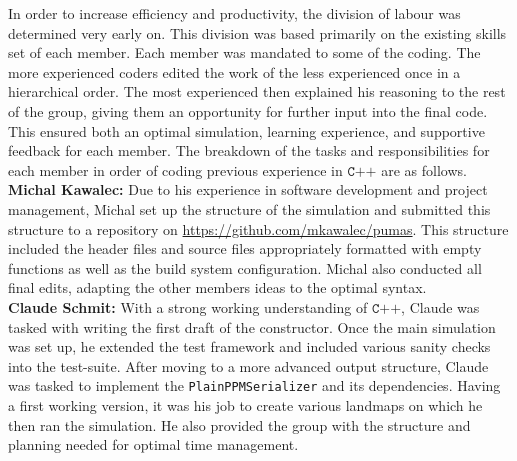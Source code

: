 \documentclass[a4paper,11pt]{article}
\begin{document}
In order to increase efficiency and productivity, the division of labour was determined very early on.  This division was based primarily on the existing skills set of each member.  Each member was mandated to some of the coding. The more experienced coders edited the work of the less experienced once in a hierarchical order. The most experienced then explained his reasoning to the rest of the group, giving them an opportunity for further input into the final code.  This ensured both an optimal simulation, learning experience, and supportive feedback for each member.  The breakdown of the tasks and responsibilities for each member in order of coding previous experience in $\texttt{C++}$ are as follows.
\\

\noindent\textbf{Michal Kawalec:}  Due to his experience in software development and project management, Michal set up the structure of the simulation and submitted this structure to a repository on \url{https://github.com/mkawalec/pumas}.  This structure included the header files and source files appropriately formatted with empty functions as well as the build system configuration. Michal also conducted all final edits, adapting the other members ideas to the optimal syntax.
\\

\noindent\textbf{Claude  Schmit:}   With a strong working understanding of $\texttt{C++}$, Claude was tasked with writing the first draft of the constructor. Once the main simulation was set up, he extended the test framework and included various sanity checks into the test-suite. After moving to a more advanced output structure, Claude was tasked to implement the \texttt{PlainPPMSerializer} and its dependencies. Having a first working version, it was his job to create various landmaps on which he then ran the simulation. He also provided the group with the structure and planning needed for optimal time management.  
\\
\end{document}

